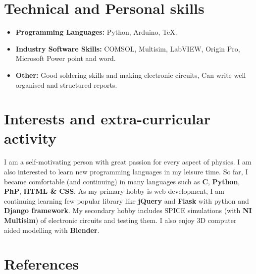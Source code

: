 \documentclass[11pt,a4paper,sans]{moderncv}        %
\begin{document}
\section{Technical and Personal skills}

\vspace{6pt}

\begin{itemize}

\item \textbf{Programming Languages:} Python, Arduino, TeX.

\vspace{6pt}

\item \textbf{Industry Software Skills:} COMSOL,  Multisim, LabVIEW, Origin Pro, Microsoft Power point and word.

\vspace{6pt}

\item \textbf{Other:} Good soldering skills and making electronic circuits, Can write well organised and structured reports.

\end{itemize}





\section{Interests and extra-curricular activity}
I am a self-motivating person with great passion for every aspect of physics. I am also interested to learn new programming languages in my leisure time. So far, I became comfortable (and continuing) in many languages such as \textbf{C}, \textbf{Python}, \textbf{PhP}, \textbf{HTML \& CSS}. As my primary hobby is web development, I am continuing learning few popular library like \textbf{jQuery} and \textbf{Flask} with python and \textbf{Django framework}. My secondary hobby includes SPICE simulations (with \textbf{NI Multisim}) of electronic circuits and testing them. I also enjoy 3D computer aided modelling with \textbf{Blender}.

\vspace{6pt}

\section{References}

\vspace{6pt}
\end{document}
